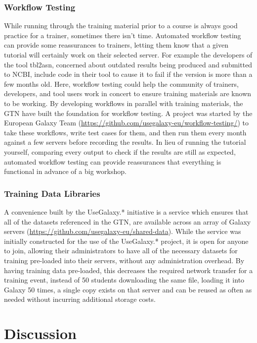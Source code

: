 \documentclass[10pt,letterpaper]{article}
\begin{document}
\subsubsection*{Workflow Testing}
While running through the training material prior to a course is always good practice for a trainer, sometimes there isn't time.
Automated workflow testing can provide some reassurances to trainers, letting them know that a given tutorial will certainly work on their selected server.
For example the developers of the tool tbl2asn, concerned about outdated results being produced and submitted to NCBI, include code in their tool to cause it to fail if the version is more than a few months old.
Here, workflow testing could help the community of trainers, developers, and tool users work in concert to ensure training materials are known to be working.
By developing workflows in parallel with training materials, the GTN have built the foundation for workflow testing. A project was started by the European Galaxy Team (\url{https://github.com/usegalaxy-eu/workflow-testing/}) to take these workflows, write test cases for them, and then run them every month against a few servers before recording the results.
In lieu of running the tutorial yourself, comparing every output to check if the results are still as expected, automated workflow testing can provide reassurances that everything is functional in advance of a big workshop.

\subsubsection*{Training Data Libraries}
A convenience built by the UseGalaxy.* initiative is a service which ensures that all of the datasets referenced in the GTN, are available across an array of Galaxy servers (\url{https://github.com/usegalaxy-eu/shared-data}).
While the service was initially constructed for the use of the UseGalaxy.* project, it is open for anyone to join, allowing their administrators to have all of the necessary datasets for training pre-loaded into their servers, without any administration overhead.
By having training data pre-loaded, this decreases the required network transfer for a training event, instead of 50 students downloading the same file, loading it into Galaxy 50 times, a single copy exists on that server and can be reused as often as needed without incurring additional storage costs.


\section*{Discussion}
\end{document}
